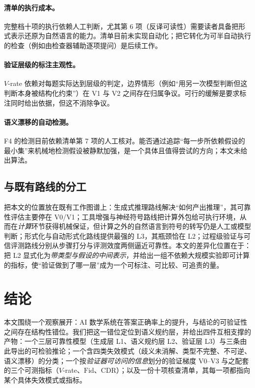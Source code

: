 \paragraph{清单的执行成本。}完整档十项的执行依赖人工判断，尤其第 6 项（反译可读性）需要读者具备把形式表示还原为自然语言的能力。清单目前未实现自动化；把它转化为可半自动执行的检查（例如由检查器辅助逐项提问）是后续工作。

\paragraph{验证层级的标注主观性。}$V$-rate 依赖对每题实际达到层级的判定，边界情形（例如“用另一次模型判断但这判断本身被结构化约束”）在 V1 与 V2 之间存在归属争议。可行的缓解是要求标注同时给出依据，但这不消除争议。

\paragraph{语义漂移的自动检测。}F4 的检测目前依赖清单第 7 项的人工核对。能否通过追踪“每一步所依赖假设的最小集”来机械地检测假设被静默加强，是一个具体且值得尝试的方向；本文未给出算法。

\subsection{与既有路线的分工}

把本文的位置放在既有工作图谱上：生成式推理路线\citep{wei2022chain,kojima2022large}解决“如何产出推理”，其可靠性评估主要停在 V0/V1；工具增强与神经符号路线\citep{gao2022pal,chen2022program,schick2023toolformer,zhou2023solving}把计算外包给可执行环境，从而在\emph{计算}环节获得机械保证，但计算之外的自然语言到符号的转写仍是人工或模型判断；形式化与自动形式化路线\citep{moura2021lean,mathlib2020lean,wu2022autoformalization}提供最强的 L3，其瓶颈恰在 L2；过程级验证与可信评测路线\citep{lightman2023let,uesato2022solving,ni2023evaluating,biderman2024lessons}分别从步骤打分与评测效度两侧逼近可靠性。本文的差异化位置在于：把 L2 显式化为\emph{带类型与假设的中间表示}，并给出一组不依赖大规模实验即可计算的指标，使“验证做到了哪一层”成为一个可标注、可比较、可追责的量。

\section{结论}\label{sec:conclusion}

本文围绕一个观察展开：AI 数学系统在答案正确率上的提升，与结论的可验证性之间存在结构性错位。我们把这一错位定位到语义规约层，并给出四件互相支撑的产物：一个三层可靠性模型（生成层 L1、语义规约层 L2、验证层 L3）与三条由此导出的可检验推论；一个含四类失效模式（歧义未消解、类型不完整、不可逆、语义漂移）的分类；一个按\emph{验证器可访问的信息}划分的验证梯度 V0--V3 与之配套的三个可测指标（$V$-rate、$\mathrm{Fid}$、$\mathrm{CDR}$）；以及一份十项核查清单，其每一项都指向某个具体失效模式或指标。

